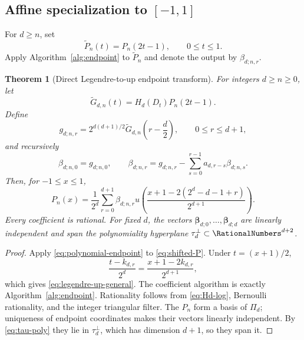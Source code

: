 \documentclass[11pt,oneside]{article}
\newtheorem{theorem}{Theorem}[section]
\theoremstyle{definition}
\theoremstyle{remark}
\begin{document}
\subsection{Affine specialization to $[-1,1]$}
For $d\ge n$, set
\begin{equation}
 \widetilde P_n(t)=P_n(2t-1),\qquad0\le t\le1.
 \label{eq:shifted-P}
\end{equation}
Apply Algorithm~\ref{alg:endpoint} to $\widetilde P_n$ and denote the output by
$\beta_{d;n,r}$.

\begin{theorem}[Direct Legendre-to-up endpoint transform]
\label{thm:legendre-endpoint}
For integers $d\ge n\ge0$, let
\begin{equation}
 \widetilde G_{d,n}(t)=H_d(D_t)P_n(2t-1).
 \label{eq:Gdn}
\end{equation}
Define
\begin{equation}
 g_{d;n,r}=2^{d(d+1)/2}
 \widetilde G_{d,n}\!\left(r-\frac d2\right),
 \qquad0\le r\le d+1,
 \label{eq:gdn}
\end{equation}
and recursively
\begin{equation}
 \beta_{d;n,0}=g_{d;n,0},
 \qquad
 \beta_{d;n,r}=g_{d;n,r}
 -\sum_{s=0}^{r-1}a_{d,r-s}\beta_{d;n,s}.
 \label{eq:beta-rec}
\end{equation}
Then, for $-1\le x\le1$,
\begin{equation}
 \boxed{
 P_n(x)=\frac1{2^d}\sum_{r=0}^{d+1}\beta_{d;n,r}
 u\!\left(
 \frac{x+1-2(2^d-d-1+r)}{2^{d+1}}
 \right).}
 \label{eq:legendre-up-general}
\end{equation}
Every coefficient is rational.  For fixed $d$, the vectors
$\bm\beta_{d;0},\ldots,\bm\beta_{d;d}$ are linearly independent and span the
polynomiality hyperplane $\tau_d^\perp\subset\RationalNumbers^{d+2}$.
\end{theorem}

\begin{proof}
Apply \eqref{eq:polynomial-endpoint} to \eqref{eq:shifted-P}.  Under
$t=(x+1)/2$,
\[
 \frac{t-k_{d,r}}{2^d}
 =\frac{x+1-2k_{d,r}}{2^{d+1}},
\]
which gives \eqref{eq:legendre-up-general}.  The coefficient algorithm is
exactly Algorithm~\ref{alg:endpoint}.  Rationality follows from
\eqref{eq:Hd-log}, Bernoulli rationality, and the integer triangular filter.
The $P_n$ form a basis of $\Pi_d$; uniqueness of endpoint coordinates makes
their vectors linearly independent.  By \eqref{eq:tau-poly} they lie in
$\tau_d^\perp$, which has dimension $d+1$, so they span it.
\end{proof}
\end{document}
